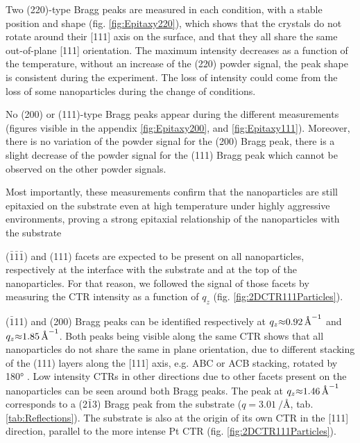 Two (220)-type Bragg peaks are measured in each condition, with a stable position and shape (fig. \ref{fig:Epitaxy220}), which shows that the crystals do not rotate around their [111] axis on the surface, and that they all share the same out-of-plane [111] orientation.
The maximum intensity decreases as a function of the temperature, without an increase of the (220) powder signal, the peak shape is consistent during the experiment.
The loss of intensity could come from the loss of some nanoparticles during the change of conditions.

No (200) or (111)-type Bragg peaks appear during the different measurements (figures visible in the appendix \ref{fig:Epitaxy200}, and \ref{fig:Epitaxy111}).
Moreover, there is no variation of the powder signal for the (200) Bragg peak, there is a slight decrease of the powder signal for the (111) Bragg peak which cannot be observed on the other powder signals.

Most importantly, these measurements confirm that the nanoparticles are still epitaxied on the substrate even at high temperature under highly aggressive environments, proving a strong epitaxial relationship of the nanoparticles with the substrate

($\bar{1}\bar{1}\bar{1}$) and (111) facets are expected to be present on all nanoparticles, respectively at the interface with the substrate and at the top of the nanoparticles.
For that reason, we followed the signal of those facets by measuring the CTR intensity as a function of $q_z$ (fig. \ref{fig:2DCTR111Particles}).

($\bar{1}$11) and (200) Bragg peaks can be identified respectively at $q_z \qty{\approx0.92}{\per\angstrom}$ and $q_z \qty{\approx1.85}{\per\angstrom}$.
Both peaks being visible along the same CTR shows that all nanoparticles do not share the same in plane orientation, due to different stacking of the (111) layers along the [111] axis, e.g. ABC or ACB stacking, rotated by \ang{180} \parencite{Jones2019}.
Low intensity CTRs in other directions due to other facets present on the nanoparticles can be seen around both Bragg peaks.
The peak at $q_z \qty{\approx1.46}{\per\angstrom}$ corresponds to a (2$\bar{1}$3) Bragg peak from the  substrate ($q = \qty{3.01}{\per\angstrom}$, tab. \ref{tab:Reflections}).
The substrate is also at the origin of its own CTR in the [111] direction, parallel to the more intense Pt CTR (fig. \ref{fig:2DCTR111Particles}).

